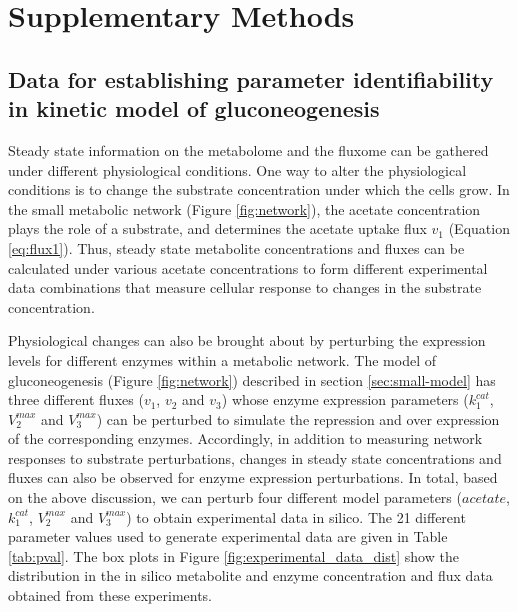 \documentclass[10pt]{article}
\begin{document}
\clearpage

\section{Supplementary Methods}
\subsection{Data for establishing parameter identifiability in kinetic model of gluconeogenesis}\label{sec:experiments}
Steady state information on the metabolome and the fluxome can be gathered under different physiological conditions. One way to alter the physiological conditions is to change the substrate concentration under which the cells grow. In the small metabolic network (Figure \ref{fig:network}), the acetate concentration plays the role of a substrate, and  determines the acetate uptake flux $v_1$ (Equation \ref{eq:flux1}). Thus, steady state metabolite concentrations and fluxes can be calculated under various acetate concentrations to form different experimental data combinations that measure cellular response to changes in the substrate concentration. 

Physiological changes can also be brought about by perturbing the expression levels for different enzymes within a metabolic network. The model of gluconeogenesis (Figure \ref{fig:network}) described in section \ref{sec:small-model} has three different fluxes ($v_1$, $v_2$ and $v_3$) whose enzyme expression parameters ($k_1^{cat}$, $V_2^{max}$ and $V_3^{max}$) can be perturbed to simulate the repression and over expression of the corresponding enzymes. Accordingly, in addition to measuring network responses to substrate perturbations, changes in steady state concentrations and fluxes can also be observed for enzyme expression perturbations. In total, based on the above discussion, we can perturb four different model parameters ($acetate$, $k_1^{cat}$, $V_2^{max}$ and $V_3^{max}$) to obtain experimental data in silico. The 21 different parameter values used to generate experimental data are given in Table \ref{tab:pval}. The box plots in Figure \ref{fig:experimental_data_dist} show the distribution in the in silico metabolite and enzyme concentration and flux data obtained from these experiments.
\end{document}
